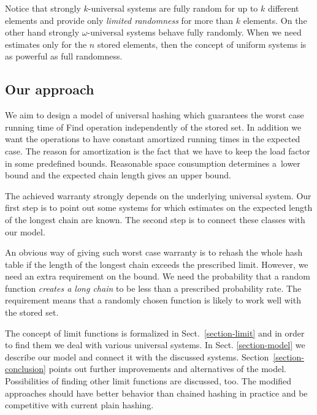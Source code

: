 Notice that strongly $k$-universal systems are fully random for up to $k$ different elements and provide only \emph{limited randomness} for more than $k$ elements. On the other hand strongly $\omega$-universal systems behave fully randomly. When we need estimates only for the $n$ stored elements, then the concept of uniform systems is as powerful as full randomness.

\subsection{Our approach}
We aim to design a model of universal hashing which guarantees the worst case running time of Find operation independently of the stored set. In addition we want the operations to have constant amortized running times in the expected case. The reason for amortization is the fact that we have to keep the load factor in some predefined bounds. Reasonable space consumption determines a~lower bound and the expected chain length gives an upper bound.

The achieved warranty strongly depends on the underlying universal system. Our first step is to point out some systems for which estimates on the expected length of the longest chain are known. The second step is to connect these classes with our model.

An obvious way of giving such worst case warranty is to rehash the whole hash table if the length of the longest chain exceeds the prescribed limit. However, we need an extra requirement on the bound. We need the probability that a random function \emph{creates a long chain} to be less than a prescribed probability rate. The requirement means that a randomly chosen function is likely to work well with the stored set.

The concept of limit functions is formalized in Sect.~\ref{section-limit} and in order to find them we deal with various universal systems. In Sect. \ref{section-model} we describe our model and connect it with the discussed systems. Section~\ref{section-conclusion} points out further improvements and alternatives of the model. Possibilities of finding other limit functions are discussed, too. The modified approaches should have better behavior than chained hashing in practice and be competitive with current plain hashing.
